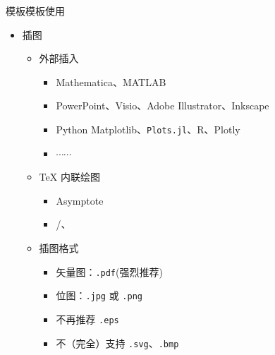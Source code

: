 \documentclass[fontset = adobe, xcolor=svgnames, t, aspectratio=169]{ctexbeamer}
\begin{document}
\begin{frame}{\nwafuthesis 模板}{模板使用}
  \stretchon
  \begin{itemize}
  \item 插图
    \begin{itemize}
    \item 外部插入

      \begin{itemize}
      \item Mathematica、MATLAB
      \item PowerPoint、Visio、Adobe Illustrator、Inkscape
      \item Python Matplotlib、\texttt{Plots.jl}、R、Plotly
      \item $\cdots\cdots$
      \end{itemize}

    \item \TeX{} 内联绘图

      \begin{itemize}
      \item Asymptote
      \item \alert{/、}
      \end{itemize}

    \item 插图格式

      \begin{itemize}
      \item 矢量图：\texttt{.pdf}(\alert{强烈推荐})
      \item 位图：\texttt{.jpg} 或 \texttt{.png}
      \item \alert{不再推荐 \texttt{.eps}}
      \item 不（完全）支持 \texttt{.svg}、\texttt{.bmp}
      \end{itemize}
    \end{itemize}
  \end{itemize}
  \stretchoff
\end{frame}


      
\end{document}
